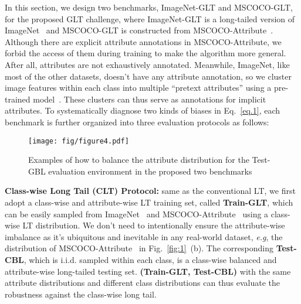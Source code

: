 \documentclass{article}
\def\eg{\emph{e.g}} \def\Eg{\emph{E.g}}
\begin{document}
In this section, we design two benchmarks, ImageNet-GLT and MSCOCO-GLT, for the proposed GLT challenge, where ImageNet-GLT is a long-tailed version of ImageNet~\cite{russakovsky2015imagenet} and MSCOCO-GLT is constructed from MSCOCO-Attribute~\cite{patterson2016coco}. Although there are explicit attribute annotations in MSCOCO-Attribute, we forbid the access of them during training to make the algorithm more general. After all, attributes are not exhaustively annotated. Meanwhile, ImageNet, like most of the other datasets, doesn't have any attribute annotation, so we cluster image features within each class into multiple ``pretext attributes'' using a pre-trained model~\cite{NEURIPS2019_9015}. These clusters can thus serve as annotations for implicit attributes. To systematically diagnose two kinds of biases in Eq.~\eqref{eq.1}, each benchmark is further organized into three evaluation protocols as follows:

\begin{wrapfigure}{r}{90mm}
    \vspace{-2mm}
   \texttt{[image: fig/figure4.pdf]}
   \caption{Examples of how to balance the attribute distribution for the Test-GBL evaluation environment in the proposed two benchmarks}
   \label{fig:4} \vspace{-2mm}
\end{wrapfigure}

\noindent\textbf{Class-wise Long Tail (CLT) Protocol:} same as the conventional LT, we first adopt a class-wise and attribute-wise LT training set, called \textbf{Train-GLT}, which can be easily sampled from ImageNet~\cite{russakovsky2015imagenet} and MSCOCO-Attribute~\cite{patterson2016coco} using a class-wise LT distribution. We don't need to intentionally ensure the attribute-wise imbalance as it's ubiquitous and inevitable in any real-world dataset, \eg, the distribution of MSCOCO-Attribute~\cite{patterson2016coco} in Fig.~\ref{fig:1}~(b). The corresponding \textbf{Test-CBL}, which is i.i.d. sampled within each class, is a class-wise balanced and attribute-wise long-tailed testing set. \textbf{(Train-GLT, Test-CBL)} with the same attribute distributions and different class distributions can thus evaluate the robustness against the class-wise long tail.  
\end{document}
